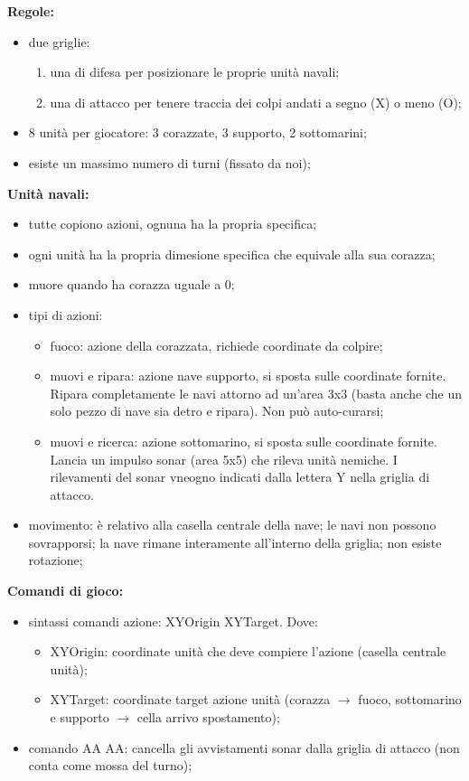 \documentclass[12pt]{article}
\begin{document}
\noindent\textbf{Regole:}
\begin{itemize}
    \item due griglie:
        \begin{enumerate}
            \item una di difesa per posizionare le proprie unità navali;
            \item una di attacco per tenere traccia dei colpi andati a segno (X) o meno (O);
        \end{enumerate}
    \item 8 unità per giocatore: 3 corazzate, 3 supporto, 2 sottomarini;
    \item esiste un massimo numero di turni (fissato da noi);
\end{itemize}
\noindent\textbf{Unità navali:}
\begin{itemize}
    \item tutte copiono azioni, ognuna ha la propria specifica;
    \item ogni unità ha la propria dimesione specifica che equivale alla sua corazza;
    \item muore quando ha corazza uguale a 0;
    \item tipi di azioni:
        \begin{itemize}
            \item fuoco: azione della corazzata, richiede coordinate da colpire;
            \item muovi e ripara: azione nave supporto, si sposta sulle coordinate fornite. Ripara completamente le navi attorno ad un'area 3x3 (basta anche che un solo pezzo di nave sia detro e ripara). Non può auto-curarsi;
            \item muovi e ricerca: azione sottomarino, si sposta sulle coordinate fornite. Lancia un impulso sonar (area 5x5) che rileva unità nemiche. I rilevamenti del sonar vneogno indicati dalla lettera Y nella griglia di attacco.
        \end{itemize}
    \item movimento: è relativo alla casella centrale della nave; le navi non possono sovrapporsi; la nave rimane interamente all'interno della griglia; non esiste rotazione;
\end{itemize}
\noindent \textbf{Comandi di gioco:}
\begin{itemize}
    \item sintassi comandi azione: XYOrigin XYTarget. Dove:
        \begin{itemize}
            \item XYOrigin: coordinate unità che deve compiere l'azione (casella centrale unità);
            \item XYTarget: coordinate target azione unità (corazza $\rightarrow$ fuoco, sottomarino e supporto $\rightarrow$ cella arrivo spostamento);
        \end{itemize}
    \item comando AA AA: cancella gli avvistamenti sonar dalla griglia di attacco (non conta come mossa del turno);
\end{itemize}
\end{document}
